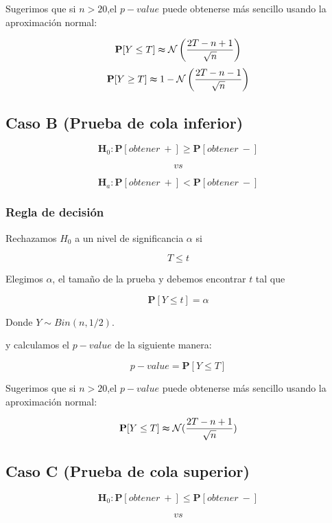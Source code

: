 \documentclass[
  a4paper,
  oneside,
  openany]{book}
\begin{document}
Sugerimos que si \(n>20\),el \(p-value\) puede obtenerse más sencillo usando la aproximación normal:

\[\mathbf{P}[Y\leq T] \thickapprox  \mathcal{N} \left(\frac{2T-n+1}{\sqrt{n}}\right)\]
\[\mathbf{P}[Y\geq T] \thickapprox 1- \mathcal{N} \left(\frac{2T-n-1}{\sqrt{n}}\right)\]

\hypertarget{caso-b-prueba-de-cola-inferior-3}{%
\subsection*{Caso B (Prueba de cola inferior)}\label{caso-b-prueba-de-cola-inferior-3}}


\[\textbf{H}_0: \mathbf{P}[obtener\ +] \geq \mathbf{P}[obtener\ -]\]

\[vs\]

\[\textbf{H}_a: \mathbf{P}[obtener\ +] < \mathbf{P}[obtener\ -]\]

\hypertarget{regla-de-decisiuxf3n-11}{%
\subsubsection*{Regla de decisión}\label{regla-de-decisiuxf3n-11}}


Rechazamos \(H_0\) a un nivel de significancia \(\alpha\) si

\[T \leq t\]

Elegimos \(\alpha\), el tamaño de la prueba y debemos encontrar \(t\) tal que

\[\mathbf{P}[Y \leq t]=\alpha\]

Donde \(Y \sim Bin (n,1/2)\).

y calculamos el \(p-value\) de la siguiente manera:

\[p-value=\mathbf{P}[Y\leq T]\]

Sugerimos que si \(n>20\),el \(p-value\) puede obtenerse más sencillo usando la aproximación normal:

\[\mathbf{P}[Y\leq T] \thickapprox  \mathcal{N} (\frac{2T-n+1}{\sqrt{n}})\]

\hypertarget{caso-c-prueba-de-cola-superior-2}{%
\subsection*{Caso C (Prueba de cola superior)}\label{caso-c-prueba-de-cola-superior-2}}


\[\textbf{H}_0: \mathbf{P}[obtener\ +] \leq \mathbf{P}[obtener\ -]\]

\[vs\]
\end{document}
